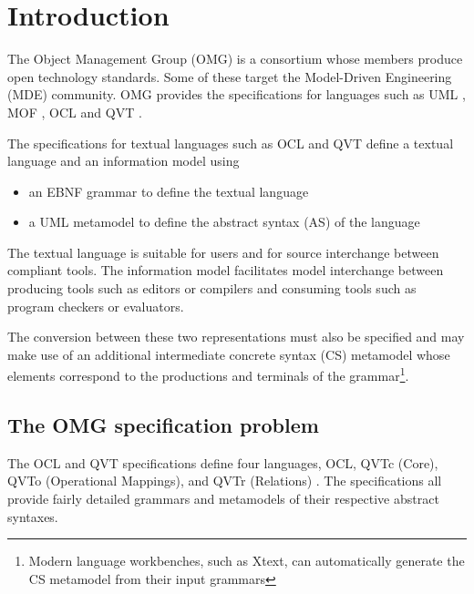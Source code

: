 \documentclass{llncs}
\begin{document}
\section{Introduction}

The Object Management Group (OMG) is a consortium whose members produce open technology standards. Some of these target the Model-Driven Engineering (MDE) community. OMG provides the specifications for languages such as UML \cite{omg2012uml}, MOF \cite{omg2013mof}, OCL \cite{omg2013ocl} and QVT \cite{omg2014qvt}.

The specifications for textual languages such as OCL and QVT define a textual language and an information model using
\begin{itemize}
\item an EBNF grammar to define the textual language
\item a UML metamodel to define the abstract syntax (AS) of the language
\end{itemize}
The textual language is suitable for users and for source interchange between compliant tools. The information model facilitates model interchange between producing tools such as editors or compilers and consuming tools such as program checkers or  evaluators.

The conversion between these two representations must also be specified and may make use of an additional intermediate concrete syntax (CS) metamodel whose elements correspond to the productions and terminals of the grammar\footnote{Modern language workbenches, such as Xtext, can automatically generate the CS metamodel from their input grammars}. 


\subsection{The OMG specification problem}

The OCL \cite{omg2013ocl} and QVT \cite{omg2014qvt} specifications define four languages, OCL, QVTc (Core), QVTo (Operational Mappings), and QVTr (Relations)%
. The specifications all provide fairly detailed grammars and metamodels of their respective abstract syntaxes.
\end{document}
